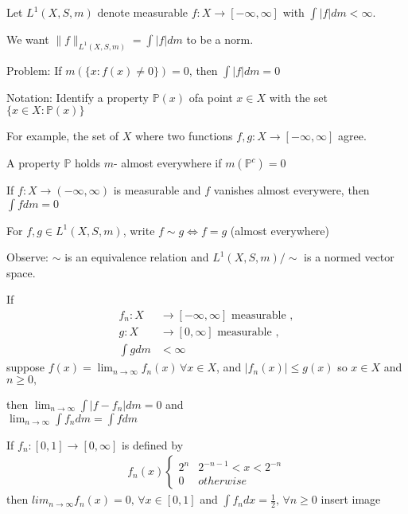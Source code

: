 Let $L^{1}(X,S, m)$ denote measurable $f: X \to [-\infty, \infty]$ with $\int | f| dm < \infty$.

We want $\|f\|_{L^{1}(X,S, m)} = \int |f| dm$ to be a norm.

Problem: If $m(\{x : f(x) \neq 0 \}) = 0$, then $\int |f| dm = 0$

\begin{remark}
	Notation: Identify a property $\mathbb{P}(x)$ ofa point $x \in X$ with the set $\{x \in X : \mathbb{P}(x)\}$
\end{remark}

For example, the set of $X$ where two functions  $f,g : X \to [-\infty, \infty]$ agree.

A property $\mathbb{P}$ holds $m$- almost everywhere if $m(\mathbb{P}^{c}) = 0$ 

\begin{example}
	If $f : X \to (-\infty, \infty)$ is measurable and $f$ vanishes almost everywere, then $\int f dm = 0$
\end{example}


For $f,g \in L^{1}(X,S, m)$, write $f \sim g \iff f=g$ (almost everywhere)

Observe: $\sim$ is an equivalence relation and $L^{1}(X,S, m) / \sim$ is a normed vector space.


\begin{definition}
	If
	\begin{align*}
		f_n : X &\to [-\infty, \infty] \text{ measurable }, \\
		g : X &\to [0, \infty] \text{ measurable }, \\
		\int g dm &< \infty
	\end{align*}
	suppose $f(x) = \lim_{n \to \infty} f_n(x)\, \forall x \in X$, and $|f_n (x) | \leq g(x)$ so
	$x \in X$ and $n \geq 0,$

	then  $\lim_{n\to \infty} \int | f - f_n | dm = 0$ and \\
	$\lim_{n\to \infty} \int f_n dm = \int f dm$

\end{definition}

\begin{example}
	If $f_n : [0,1] \to [0, \infty]$ is defined by
	\begin{align*}
		f_n (x) 
		\begin{cases}
			2^n & 2^{-n-1} < x < 2^{-n} \\
			0 & otherwise
		\end{cases}
	\end{align*} 
	then $lim_{n \to \infty} f_n (x) = 0, \, \forall x \in [0,1]$ and  $\int f_{n} dx = \frac{1}{2} ,\, \forall n \geq 0$
	insert image
\end{example}

